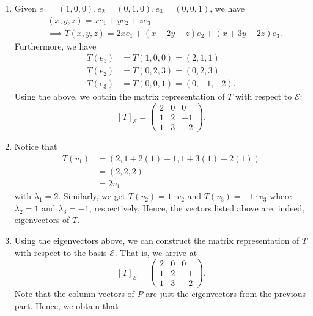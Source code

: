 \documentclass[a4paper]{article}
\begin{document}
\begin{solution}
\begin{enumerate}
    \item Given \( {e}_{1} = (1,0,0), {e}_{2} = (0,1,0), {e}_{3} = (0,0,1) \), we have
        \begin{align*}
            &(x,y,z) = x {e}_{1} + y{e}_{2} + z {e}_{3} \\
            &\implies T(x,y,z) = 2 x {e}_{1} + (x+ 2y - z) {e}_{2} + (x + 3y - 2z) {e}_{3}.
        \end{align*}
        Furthermore, we have 
        \begin{align*}
            T({e}_{1}) &= T(1,0,0) = (2,1,1) \\
            T({e}_{2}) &= T(0,2,3) = (0,2,3) \\
            T({e}_{3}) &= T(0,0,1) = (0,-1,-2).
        \end{align*}
        Using the above, we obtain the matrix representation of \( T  \) with respect to \( \mathcal{E} \):
        \[  [T]_{\mathcal{E}} = \begin{pmatrix}  2 & 0 & 0 \\ 1 & 2 & -1 \\ 1 & 3 & -2  \end{pmatrix}.   \]
    \item Notice that 
        \begin{align*}
            T({v}_{1}) &= (2, 1 + 2(1) - 1 , 1 + 3(1) - 2(1)) \\
                       &= (2,2,2) \\
                       &= 2 {v}_{1}
        \end{align*}
        with \( {\lambda}_{1} = 2  \). 
        Similarly, we get \( T({v}_{2}) = 1 \cdot {v}_{2} \) and \( T({v}_{3}) = - 1 \cdot {v}_{3} \) where \( {\lambda}_{2} = 1   \) and \( {\lambda}_{3} = -1  \), respectively. Hence, the vectors listed above are, indeed, eigenvectors of \( T  \). 
    \item  Using the eigenvectors above, we can construct the matrix representation of \( T  \) with respect to the basis \( \mathcal{E} \). That is, we arrive at
        \[  [T]_{\mathcal{E}}^{} = \begin{pmatrix}  2 & 0 &  0 \\ 1 & 2 & - 1 \\ 1 & 3 & -2  \end{pmatrix}.  \]
        Note that the column vectors of \( P  \) are just the eigenvectors from the previous part. Hence, we obtain that  

\end{enumerate}
\end{solution}
\end{document}
